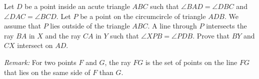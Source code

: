 Let $D$ be a point inside an acute triangle $ABC$ such that $\angle BAD= \angle DBC$ and $\angle DAC=\angle BCD$.
Let $P$ be a point on the circumcircle of triangle $ADB$.
We assume that $P$ lies outside of the triangle $ABC$.
A line through $P$ intersects the ray $BA$ in $X$ and the ray $CA$ in $Y$ such that $\angle XPB=\angle PDB$.
Prove that $BY$ and $CX$ intersect on $AD$.

\textit{Remark:} For two points $F$ and $G$,
the ray $FG$ is the set of points on the line $FG$ that lies on the same side of $F$ than $G$.

